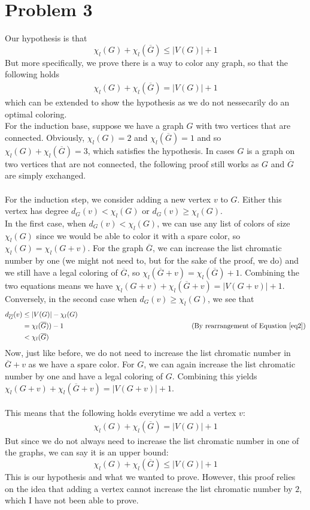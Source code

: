 \documentclass[a4paper]{article}
\newcommand{\comment}[1]{%
  \text{\phantom{(#1)}} \tag{#1}}
\begin{document}
\section{Problem 3}
Our hypothesis is that
$$
\chi_l(G)+\chi_l(\overline{G})\leq |V(G)|+1
$$
But more specifically, we prove there is a way to color any graph, so that the following holds
\begin{align}\label{eq2}
\chi_l(G)+\chi_l(\overline{G})=|V(G)|+1
\end{align}
which can be extended to show the hypothesis as we do not nessecarily do an optimal coloring.\\
For the induction base, suppose we have a graph $G$ with two vertices that are connected. Obviously, $\chi_l(G)=2$ and $\chi_l(\overline{G})=1$ and so $\chi_l(G)+\chi_l(\overline{G})=3$, which satisfies the hypothesis. In cases $G$ is a graph on two vertices that are not connected, the following proof still works as $G$ and $\overline{G}$ are simply exchanged. \\
\\
For the induction step, we consider adding a new vertex $v$ to $G$. Either this vertex has degree $d_G(v)<\chi_l(G)$ or $d_G(v)\geq \chi_l(G)$. \\
In the first case, when $d_G(v)<\chi_l(G)$, we can use any list of colors of size $\chi_l(G)$ since we would be able to color it with a spare color, so $\chi_l(G)=\chi_l(G+v)$. For the graph $\overline{G}$, we can increase the list chromatic number by one (we might not need to, but for the sake of the proof, we do) and we still have a legal coloring of $\overline{G}$, so $\chi_l(\overline{G}+v)= \chi_l(\overline{G})+1$. Combining the two equations means we have $\chi_l(G+v)+\chi_l(\overline{G}+v)= |V(G+v)|+1$. \\
Conversely, in the second case when $d_G(v)\geq \chi_l(G)$, we see that
\begin{align*}
  d_{\overline{G}}(v)&\leq |V(G)|-\chi_l(G) \\
                     &= \chi_l(\overline{G}))-1 \comment{By rearrangement of Equation \ref{eq2}} \\
                     &< \chi_l(\overline{G})
\end{align*}
Now, just like before, we do not need to increase the list chromatic number in $\overline{G}+v$ as we have a spare color. For $G$, we can again increase the list chromatic number by one and have a legal coloring of $G$. Combining this yields $\chi_l(G+v)+\chi_l(\overline{G}+v)= |V(G+v)|+1$. \\
\\
This means that the following holds everytime we add a vertex $v$:
\begin{align}\label{eq2}
\chi_l(G)+\chi_l(\overline{G})=|V(G)|+1
\end{align}
But since we do not always need to increase the list chromatic number in one of the graphs, we can say it is an upper bound:
$$
\chi_l(G)+\chi_l(\overline{G})\leq |V(G)|+1
$$
This is our hypothesis and what we wanted to prove. However, this proof relies on the idea that adding a vertex cannot increase the list chromatic number by $2$, which I have not been able to prove.
\end{document}
